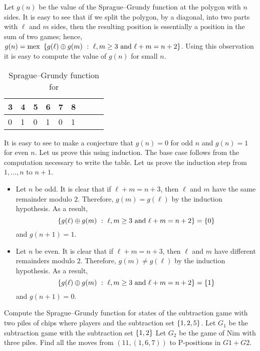Let $g(n)$ be the value of the Sprague--Grundy function at the polygon with $n$
sides. It is easy to see that if we split the polygon, by a diagonal, into two
parts with $\ell$ and $m$ sides, then the resulting position is essentially a
position in the sum of two games; 
hence, 
$g(n) = 
  \mex \set[
    \ell, m \ge 3 \text{ and } \ell + m = n + 2
  ]{g(\ell) \bitwisexor g(m)}$.
Using this observation it is easy to compute the value of $g(n)$ for small $n$.
\begin{table}[h!]
  \centering
  \begin{tabular}{l l l l l l l l l}
      \toprule
      3 & 4 & 5 & 6 & 7 & 8 \\
      \midrule
      0 & 1 & 0 & 1 & 0 & 1 \\
      \bottomrule
  \end{tabular}
  \caption{Sprague--Grundy function for }
\end{table}
It is easy to see to make a conjecture that $g(n) = 0$ for odd $n$ and $g(n) =
1$ for even $n$. Let us prove this using induction. The base case follows from
the computation necessary to write the table. Let us prove the induction step
from $1, \dots, n$ to $n + 1$.
\begin{itemize}
  \item Let $n$ be odd. It is clear that if $\ell + m = n + 3$, then $\ell$ and
    $m$ have the same remainder modulo $2$. Therefore, $g(m) = g(\ell)$ by the
    induction hypothesis. As a result, 
    \[
      \set[
        \ell, m \ge 3 \text{ and } \ell + m = n + 2
      ]{g(\ell) \bitwisexor g(m)} = \set{0}
    \] and $g(n + 1) = 1$.
    
  \item Let $n$ be even. It is clear that if $\ell + m = n + 3$, then $\ell$ and
    $m$ have different remainders modulo $2$. Therefore, $g(m) \neq g(\ell)$ by the
    induction hypothesis. As a result, 
    \[
      \set[
        \ell, m \ge 3 \text{ and } \ell + m = n + 2
      ]{g(\ell) \bitwisexor g(m)} = \set{1}
    \] 
    and $g(n + 1) = 0$.
\end{itemize}
\begin{chapterendexercises}
    \exercise Compute the Sprague--Grundy function for states of the subtraction
      game with two piles of chips where players and the subtraction set 
      $\set{1, 2, 5}$.
    \exercise Let $G_1$ be the subtraction game with the subtraction set
      $\set{1, 2}$
      Let $G_2$ be the game of Nim with three piles.
      Find all the moves from $(11, (1, 6, 7))$ to P-positions in 
      $G1 + G2$.
\end{chapterendexercises}
